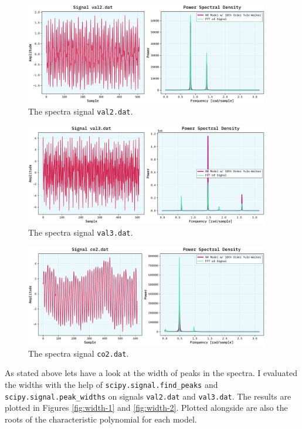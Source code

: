 \documentclass[10pt, titlepage, a4paper]{article}
\begin{document}
\begin{figure}[H]
    \centering
    \includegraphics[width=0.95\textwidth]{../MaxEntropy/Images/yw-demo-val2.dat.pdf}
    \caption{The spectra signal \texttt{val2.dat}.}
    \label{fig:spectra-1}
\end{figure}

\begin{figure}[H]
    \centering
    \includegraphics[width=0.95\textwidth]{../MaxEntropy/Images/yw-demo-val3.dat.pdf}
    \caption{The spectra signal \texttt{val3.dat}.}
    \label{fig:spectra-2}
\end{figure}

\begin{figure}[H]
    \centering
    \includegraphics[width=0.95\textwidth]{../MaxEntropy/Images/yw-demo-co2.dat.pdf}
    \caption{The spectra signal \texttt{co2.dat}.}
    \label{fig:spectra-3}
\end{figure}

As stated above lets have a look at the width of peaks in the spectra. I evaluated the widths with the help of 
\texttt{scipy.signal.find\_peaks} and \texttt{scipy.signal.peak\_widths} on signals \texttt{val2.dat} and \texttt{val3.dat}.
The results are plotted in Figures \ref{fig:width-1} and \ref{fig:width-2}. Plotted alongside are also the roots of the 
characteristic polynomial for each model.
\end{document}
